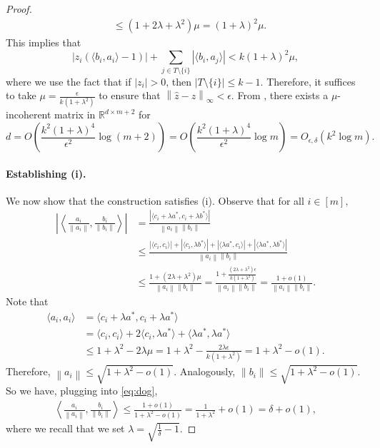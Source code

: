 \documentclass[11pt]{article}
\newcommand{\RR}{\mathbb{R}}
\newcommand{\norm}[1]{\left\|#1\right\|}
\begin{document}
\begin{proof}
\begin{align}
        &\le (1+2\lambda+\lambda^2)\mu = (1 + \lambda)^2\mu.
    \end{align}
    This implies that 
    \begin{equation}
        |z_i(\langle b_i, a_i \rangle - 1)| + \sum_{j\in T\setminus \{i\}} |\langle b_i, a_j\rangle| < k (1 + \lambda)^2\mu,
    \end{equation}
    where we use the fact that if $|z_i| > 0$, then $|T\setminus \{i\}|\le k-1.$ Therefore, it suffices to take $\mu = \frac{\epsilon}{k(1+\lambda^2)}$ to ensure that $\norm{\hat{z}-z}_\infty < \epsilon.$ From , there exists a $\mu$-incoherent matrix in $\RR^{d\times m+2}$ for
    \begin{equation}
        d = O\left(\frac{k^2(1+\lambda)^4}{\epsilon^2}\log (m+2)\right) = O\left(\frac{k^2(1+\lambda)^4}{\epsilon^2}\log m\right) = O_{\epsilon,\delta}(k^2\log m).
    \end{equation}

    \paragraph{Establishing (i).} We now show that the construction satisfies (i). Observe that for all $i\in [m],$
    \begin{align}
        \left|\left\langle \frac{a_i}{\norm{a_i}}, \frac{b_i}{\norm{b_i}} \right\rangle\right|
        &= \frac{|\langle c_i + \lambda a^*, c_i + \lambda b^*\rangle|}{\norm{a_i}\norm{b_i}}\\
        &\le \frac{|\langle c_i, c_i\rangle| + |\langle c_i, \lambda b^*\rangle| + |\langle \lambda a^*, c_i \rangle| + |\langle \lambda a^*, \lambda b^* \rangle|}{\norm{a_i}\norm{b_i}}\\
        &\le \frac{1 + (2\lambda  + \lambda^2)\mu}{\norm{a_i}\norm{b_i}} = \frac{1 + \frac{(2\lambda  + \lambda^2)\epsilon}{k(1+\lambda^2)}}{\norm{a_i}\norm{b_i}} = \frac{1 + o(1)}{\norm{a_i}\norm{b_i}}.\label{eq:dog}
    \end{align}
    Note that
    \begin{align}
        \langle a_i, a_i\rangle &= \langle c_i + \lambda a^*, c_i + \lambda a^* \rangle\\ &= \langle c_i, c_i\rangle + 2\langle c_i, \lambda a^*\rangle + \langle \lambda a^*, \lambda a^*\rangle\\
        &\le 1 + \lambda^2 - 2\lambda\mu =  1 + \lambda^2 - \frac{2\lambda\epsilon}{k(1+\lambda^2)} = 1 + \lambda^2 - o(1).
    \end{align}
    Therefore, $\norm{a_i} \le \sqrt{1 + \lambda^2 - o(1)}$. Analogously, $\norm{b_i} \le \sqrt{1 + \lambda^2 - o(1)}.$
    So we have, plugging into \eqref{eq:dog},
    \begin{align}
         \left\langle \frac{a_i}{\norm{a_i}}, \frac{b_i}{\norm{b_i}} \right\rangle
         \le \frac{1 + o(1)}{1 + \lambda^2 - o(1)} = \frac{1}{1 + \lambda^2} + o(1) = \delta + o(1),
    \end{align}
    where we recall that we set $\lambda = \sqrt{\frac{1}{\delta} - 1}.$


\end{proof}
\end{document}
